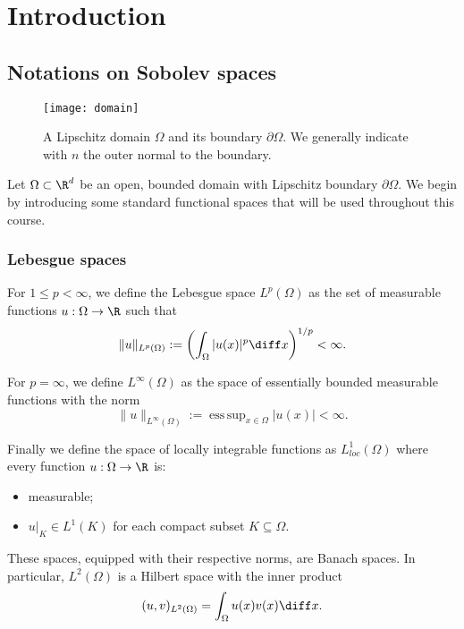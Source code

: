 
\chapter[Introduction]{Introduction}

\section{Notations on Sobolev spaces}
\label{sec:sobolev_notations}

\begin{figure}[!ht]
  \centering
  \texttt{[image: domain]}
  \caption{A Lipschitz domain $\Omega$ and its boundary $\partial\Omega$. We generally indicate with $n$ the outer normal to the boundary.}
  \label{fig:domain}
\end{figure}

Let $\Omega \subset \R^d$ be an open, bounded domain with Lipschitz boundary $\partial\Omega$. We begin by introducing some standard functional spaces that will be used throughout this course.

\subsection{Lebesgue spaces}

For $1 \leq p < \infty$, we define the Lebesgue space $L^p(\Omega)$ as the set of measurable functions $u: \Omega \to \R$ such that
\[
\|u\|_{L^p(\Omega)} := \left(\int_\Omega |u(x)|^p \diff x \right)^{1/p} < \infty.
\]

For $p = \infty$, we define $L^\infty(\Omega)$ as the space of essentially bounded measurable functions with the norm
\[
\|u\|_{L^\infty(\Omega)} := \operatorname{ess\,sup}_{x \in \Omega} |u(x)| < \infty.
\]

Finally we define the space of locally integrable functions as $L^1_{loc}(\Omega)$ where every function $u: \Omega \to \R$ is:
\begin{itemize}
\item measurable;
\item $u|_{K} \in L^1(K)$ for each compact subset $K \subseteq \Omega$.
\end{itemize}

These spaces, equipped with their respective norms, are Banach spaces. In particular, $L^2(\Omega)$ is a Hilbert space with the inner product
\[
(u, v)_{L^2(\Omega)} = \int_\Omega u(x) v(x) \diff x.
\]




